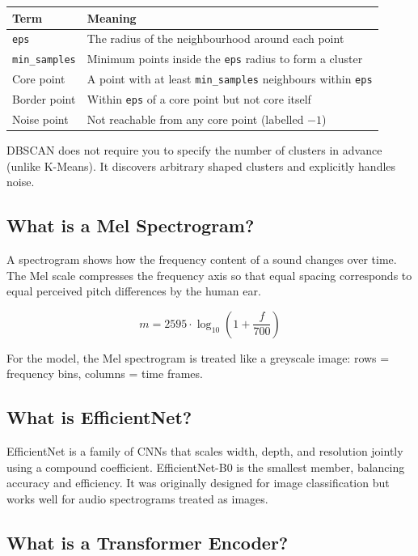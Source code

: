 \documentclass[12pt,a4paper]{article}
\begin{document}
\begin{center}
\begin{tabular}{ll}
\toprule
\textbf{Term} & \textbf{Meaning} \\
\midrule
\texttt{eps} & The radius of the neighbourhood around each point \\
\texttt{min\_samples} & Minimum points inside the \texttt{eps} radius to form a cluster \\
Core point & A point with at least \texttt{min\_samples} neighbours within \texttt{eps} \\
Border point & Within \texttt{eps} of a core point but not core itself \\
Noise point & Not reachable from any core point (labelled $-1$) \\
\bottomrule
\end{tabular}
\end{center}

DBSCAN does not require you to specify the number of clusters in advance (unlike K-Means). It discovers arbitrary shaped clusters and explicitly handles noise.

\subsection{What is a Mel Spectrogram?}

A spectrogram shows how the frequency content of a sound changes over time. The Mel scale compresses the frequency axis so that equal spacing corresponds to equal perceived pitch differences by the human ear.

\[
m = 2595 \cdot \log_{10}\!\left(1 + \frac{f}{700}\right)
\]

For the model, the Mel spectrogram is treated like a greyscale image: rows = frequency bins, columns = time frames.

\subsection{What is EfficientNet?}

EfficientNet is a family of CNNs that scales width, depth, and resolution jointly using a compound coefficient. EfficientNet-B0 is the smallest member, balancing accuracy and efficiency. It was originally designed for image classification but works well for audio spectrograms treated as images.

\subsection{What is a Transformer Encoder?}
\end{document}
